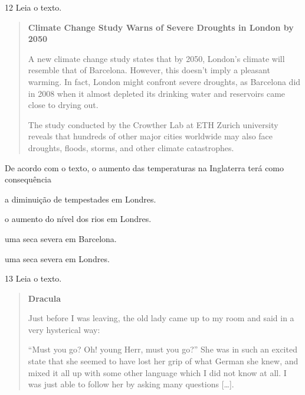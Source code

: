 \pagebreak
\num{12} Leia o texto.

\begin{quote}
\textbf{Climate Change Study Warns of Severe Droughts in London by 2050}

A new climate change study states that by 2050, London's climate will
resemble that of Barcelona. However, this doesn't imply a pleasant
warming. In fact, London might confront severe droughts, as Barcelona
did in 2008 when it almost depleted its drinking water and reservoirs
came close to drying out.

The study conducted by the Crowther Lab at ETH Zurich university reveals
that hundreds of other major cities worldwide may also face droughts,
floods, storms, and other climate catastrophes.

\end{quote}

De acordo com o texto, o aumento das temperaturas na Inglaterra terá
como consequência

\begin{escolha}
\item a diminuição de tempestades em Londres.

\item o aumento do nível dos rios em Londres.

\item uma seca severa em Barcelona.

\item uma seca severa em Londres.
\end{escolha}

\num{13} Leia o texto.

\begin{quote}
\textbf{Dracula}

Just before I was leaving, the old lady came up to my room and said in a
very hysterical way:

``Must you go? Oh! young Herr, must you go?'' She was in such an excited
state that she seemed to have lost her grip of what German she knew, and
mixed it all up with some other language which I did not know at all. I
was just able to follow her by asking many questions {[}\ldots{}{]}.

\end{quote}

